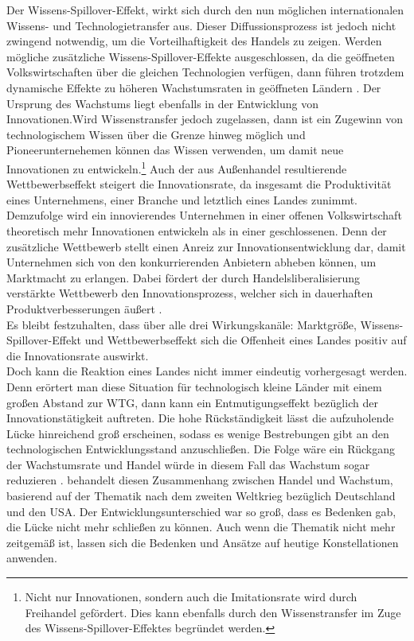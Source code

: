 Der Wissens-Spillover-Effekt, wirkt sich durch den nun m{\"o}glichen internationalen Wissens- und Technologietransfer aus. Dieser Diffussionsprozess ist jedoch nicht zwingend notwendig, um die Vorteilhaftigkeit des Handels zu zeigen. Werden m{\"o}gliche zus{\"a}tzliche Wissens-Spillover-Effekte ausgeschlossen, da die ge{\"o}ffneten Volkswirtschaften {\"u}ber die gleichen Technologien verf{\"u}gen, dann f{\"u}hren trotzdem dynamische Effekte zu h{\"o}heren Wachstumsraten in ge{\"o}ffneten L{\"a}ndern \citep{Grossman.1991b}. Der Ursprung des Wachstums liegt ebenfalls in der Entwicklung von Innovationen.\newline Wird Wissenstransfer jedoch zugelassen, dann ist ein Zugewinn von technologischem Wissen {\"u}ber die Grenze hinweg m{\"o}glich und  Pioneerunternehemen k{\"o}nnen das Wissen verwenden, um damit neue Innovationen zu entwickeln.\footnote{Nicht nur Innovationen, sondern auch die Imitationsrate wird durch Freihandel gefördert. Dies kann ebenfalls durch den Wissenstransfer im Zuge des Wissens-Spillover-Effektes begründet werden.} \newline 
Auch der aus Au{\ss}enhandel resultierende Wettbewerbseffekt steigert die Innovationsrate, da insgesamt die Produktivit{\"a}t eines Unternehmens, einer Branche und letztlich eines Landes zunimmt. Demzufolge wird ein innovierendes Unternehmen in einer offenen Volkswirtschaft theoretisch mehr Innovationen entwickeln als in einer geschlossenen.
Denn der zusätzliche Wettbewerb stellt einen Anreiz zur Innovationsentwicklung dar, damit Unternehmen sich von den konkurrierenden Anbietern abheben können, um Marktmacht zu erlangen. Dabei f{\"o}rdert der durch Handelsliberalisierung verst{\"a}rkte Wettbewerb den Innovationsprozess, welcher sich in dauerhaften Produktverbesserungen {\"a}u{\ss}ert \citep{Segerstrom.1990}.\\


Es bleibt festzuhalten, dass über alle drei Wirkungskan{\"a}le: Marktgr{\"o}{\ss}e, Wissens-Spillover-Effekt und Wettbewerbseffekt sich die Offenheit eines Landes positiv auf die Innovationsrate auswirkt.\\
Doch kann die Reaktion eines Landes nicht immer eindeutig vorhergesagt werden. Denn erörtert man diese Situation für technologisch kleine Länder mit einem gro{\ss}en Abstand zur WTG, dann kann ein Entmutigungseffekt bezüglich der Innovationstätigkeit auftreten. Die hohe Rückständigkeit lässt die aufzuholende Lücke hinreichend gro{\ss} erscheinen, sodass es wenige Bestrebungen gibt an den technologischen Entwicklungsstand anzuschlie{\ss}en. Die Folge wäre ein Rückgang der Wachstumsrate und Handel würde in diesem Fall das Wachstum sogar reduzieren \citep{Aghion.2015}. \citet{Hicks.1968} behandelt diesen Zusammenhang zwischen Handel und Wachstum, basierend auf der Thematik nach dem zweiten Weltkrieg bez{\"u}glich Deutschland und den USA. Der Entwicklungsunterschied war so gro{\ss}, dass es Bedenken gab, die L{\"u}cke nicht mehr schlie{\ss}en zu k{\"o}nnen. Auch wenn die Thematik nicht mehr zeitgem{\"a}{\ss} ist, lassen sich die Bedenken und Ans{\"a}tze auf heutige Konstellationen anwenden.\\


